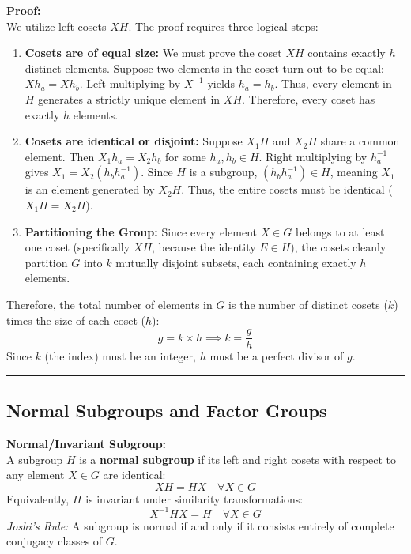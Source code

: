 \documentclass[11pt, a4paper]{report}
\begin{document}
\vspace{0.5em}
\textbf{Proof:} \\
We utilize left cosets $X H$. The proof requires three logical steps:
\begin{enumerate}
    \item \textbf{Cosets are of equal size:} We must prove the coset $XH$ contains exactly $h$ distinct elements. Suppose two elements in the coset turn out to be equal: $X h_a = X h_b$. Left-multiplying by $X^{-1}$ yields $h_a = h_b$. Thus, every element in $H$ generates a strictly unique element in $XH$. Therefore, every coset has exactly $h$ elements.
    \item \textbf{Cosets are identical or disjoint:} Suppose $X_1 H$ and $X_2 H$ share a common element. Then $X_1 h_a = X_2 h_b$ for some $h_a, h_b \in H$. Right multiplying by $h_a^{-1}$ gives $X_1 = X_2 (h_b h_a^{-1})$. Since $H$ is a subgroup, $(h_b h_a^{-1}) \in H$, meaning $X_1$ is an element generated by $X_2 H$. Thus, the entire cosets must be identical ($X_1 H = X_2 H$).
    \item \textbf{Partitioning the Group:} Since every element $X \in G$ belongs to at least one coset (specifically $X H$, because the identity $E \in H$), the cosets cleanly partition $G$ into $k$ mutually disjoint subsets, each containing exactly $h$ elements.
\end{enumerate}

Therefore, the total number of elements in $G$ is the number of distinct cosets ($k$) times the size of each coset ($h$):
\[ g = k \times h \implies k = \frac{g}{h} \]
Since $k$ (the index) must be an integer, $h$ must be a perfect divisor of $g$.

\vspace{1em}
\hrule
\vspace{1em}

\subsection*{Normal Subgroups and Factor Groups}

\textbf{Normal/Invariant Subgroup:} \\
A subgroup $H$ is a \textbf{normal subgroup} if its left and right cosets with respect to any element $X \in G$ are identical:
\[ XH = HX \quad \forall X \in G \]
Equivalently, $H$ is invariant under similarity transformations:
\[ X^{-1}HX = H \quad \forall X \in G \]
\textit{Joshi's Rule:} A subgroup is normal if and only if it consists entirely of complete conjugacy classes of $G$.
\end{document}
